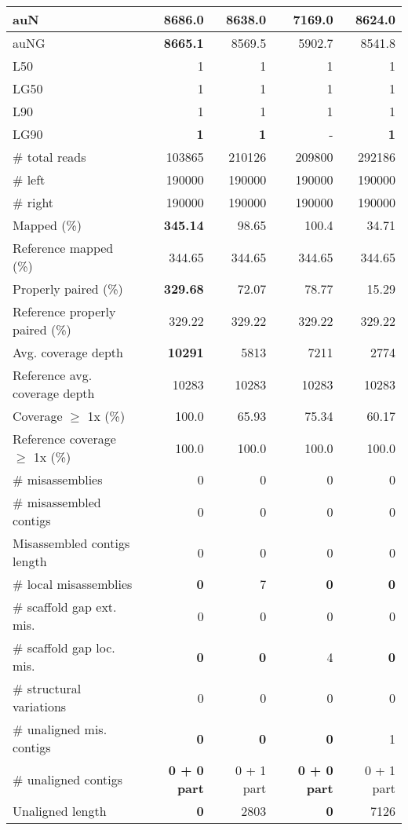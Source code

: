 \documentclass[12pt,a4paper]{article}
\begin{document}
\begin{table}[ht]
\begin{center}
\begin{tabular}{|l*{4}{|r}|}
auN & {\bf 8686.0} & 8638.0 & 7169.0 & 8624.0 \\ \hline
auNG & {\bf 8665.1} & 8569.5 & 5902.7 & 8541.8 \\ \hline
L50 & 1 & 1 & 1 & 1 \\ \hline
LG50 & 1 & 1 & 1 & 1 \\ \hline
L90 & 1 & 1 & 1 & 1 \\ \hline
LG90 & {\bf 1} & {\bf 1} & - & {\bf 1} \\ \hline
\# total reads & 103865 & 210126 & 209800 & 292186 \\ \hline
\# left & 190000 & 190000 & 190000 & 190000 \\ \hline
\# right & 190000 & 190000 & 190000 & 190000 \\ \hline
Mapped (\%) & {\bf 345.14} & 98.65 & 100.4 & 34.71 \\ \hline
Reference mapped (\%) & 344.65 & 344.65 & 344.65 & 344.65 \\ \hline
Properly paired (\%) & {\bf 329.68} & 72.07 & 78.77 & 15.29 \\ \hline
Reference properly paired (\%) & 329.22 & 329.22 & 329.22 & 329.22 \\ \hline
Avg. coverage depth & {\bf 10291} & 5813 & 7211 & 2774 \\ \hline
Reference avg. coverage depth & 10283 & 10283 & 10283 & 10283 \\ \hline
Coverage $\geq$ 1x (\%) & 100.0 & 65.93 & 75.34 & 60.17 \\ \hline
Reference coverage $\geq$ 1x (\%) & 100.0 & 100.0 & 100.0 & 100.0 \\ \hline
\# misassemblies & 0 & 0 & 0 & 0 \\ \hline
\# misassembled contigs & 0 & 0 & 0 & 0 \\ \hline
Misassembled contigs length & 0 & 0 & 0 & 0 \\ \hline
\# local misassemblies & {\bf 0} & 7 & {\bf 0} & {\bf 0} \\ \hline
\# scaffold gap ext. mis. & 0 & 0 & 0 & 0 \\ \hline
\# scaffold gap loc. mis. & {\bf 0} & {\bf 0} & 4 & {\bf 0} \\ \hline
\# structural variations & 0 & 0 & 0 & 0 \\ \hline
\# unaligned mis. contigs & {\bf 0} & {\bf 0} & {\bf 0} & 1 \\ \hline
\# unaligned contigs & {\bf 0 + 0 part} & 0 + 1 part & {\bf 0 + 0 part} & 0 + 1 part \\ \hline
Unaligned length & {\bf 0} & 2803 & {\bf 0} & 7126 \\ \hline

\end{tabular}
\end{center}
\end{table}
\end{document}
